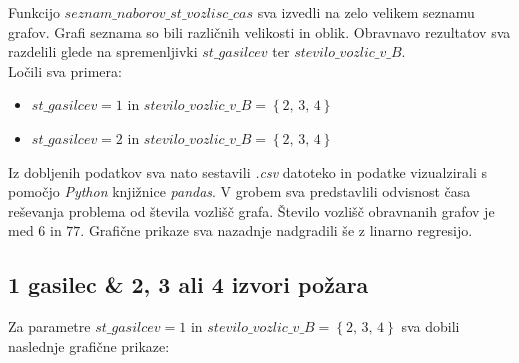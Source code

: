 \documentclass[a4paper, 12pt]{article}
\begin{document}
\noindent Funkcijo $seznam\_naborov\_st\_vozlisc\_cas$ sva izvedli na zelo velikem seznamu grafov. Grafi seznama
so bili različnih velikosti in oblik. Obravnavo rezultatov sva razdelili glede 
na spremenljivki $st\_gasilcev$ ter $stevilo\_vozlic\_v\_B$. \\
Ločili sva primera:
\begin{itemize}
    \item $st\_gasilcev = 1$ in $stevilo\_vozlic\_v\_B = \left\{ 2, \, 3, \, 4 \right\}$
    \item $st\_gasilcev = 2$ in $stevilo\_vozlic\_v\_B = \left\{ 2, \, 3, \, 4 \right\}$
\end{itemize}

\noindent Iz dobljenih podatkov sva nato sestavili \emph{.csv} datoteko in podatke vizualzirali s pomočjo \emph{Python} knjižnice \emph{pandas}. 
V grobem sva predstavlili odvisnost časa reševanja problema od števila vozlišč grafa. Število vozlišč obravnanih grafov
je med $6$ in $77$. Grafične prikaze sva nazadnje nadgradili še z linarno regresijo. 

\pagebreak

\subsection{1 gasilec \& 2, 3 ali 4 izvori požara}

Za parametre $st\_gasilcev = 1$ in $stevilo\_vozlic\_v\_B = \left\{ 2, \, 3, \, 4 \right\}$ sva dobili
naslednje grafične prikaze:
\end{document}
